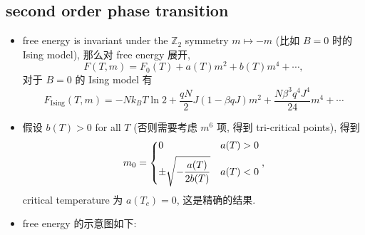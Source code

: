 \subsection{second order phase transition}
\begin{itemize}
	\item free energy is invariant under the $\mathbb{Z}_2$ symmetry $m \mapsto - m$ (比如 $B = 0$ 时的 Ising model), 那么对 free energy 展开,
	\begin{equation} \label{11.5.3}
		F(T, m) = F_0(T) + a(T) m^2 + b(T) m^4 + \cdots,
	\end{equation}
	对于 $B = 0$ 的 Ising model 有
	\begin{equation}
		F_\text{Ising}(T, m) = - N k_B T \ln 2 + \frac{q N}{2} J (1 - \beta q J) m^2 + \frac{N \beta^3 q^4 J^4}{24} m^4 + \cdots
	\end{equation}
	
	\item 假设 $b(T) > 0$ for all $T$ (否则需要考虑 $m^6$ 项, 得到 tri-critical points), 得到
	\begin{equation}
		m_0 = \begin{dcases}
			0 & a(T) > 0 \\
			\pm \sqrt{- \frac{a(T)}{2 b(T)}} & a(T) < 0
		\end{dcases},
	\end{equation}
	critical temperature 为 $a(T_c) = 0$, 这是精确的结果.
	
	\item free energy 的示意图如下:
	

\end{itemize}
